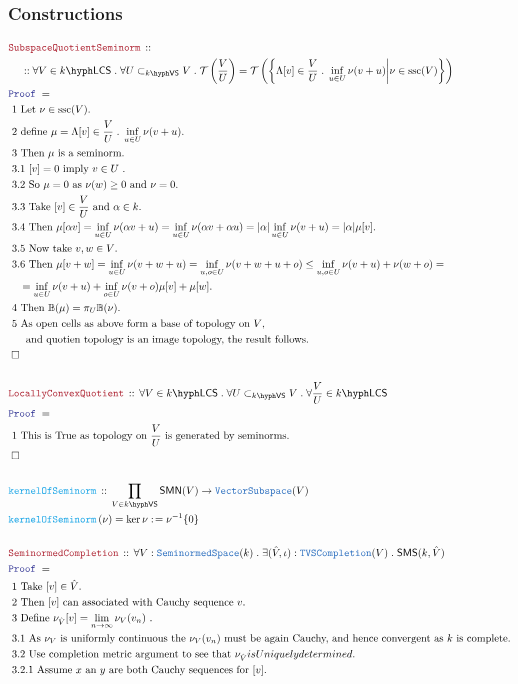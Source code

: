 \documentclass[12pt]{scrartcl}
\newcommand{\TYPE}[1]{\textcolor{NavyBlue}{\mathtt{#1}}}
\newcommand{\FUNC}[1]{\textcolor{Cerulean}{\mathtt{#1}}}
\newcommand{\LOGIC}[1]{\textcolor{Blue}{\mathtt{#1}}}
\newcommand{\THM}[1]{\textcolor{Maroon}{\mathtt{#1}}}
\renewcommand{\.}{\; . \;}
\newcommand{\de}{: \kern 0.1pc =}
\newcommand{\Act}[1]{\left( #1 \right)}
\newcommand{\Theorem}[2]{& \THM{#1} \, :: \, #2 \\ & \Proof = \\ }
\newcommand{\DeclareFunc}[2]{& \FUNC{#1} \, :: \, #2 \\}
\newcommand{\DefineNamedFunc}[4]{&  \FUNC{#1}\Act{#2} = #3 \de #4 \\}
\newcommand{\NewLine}{\\ & \kern 1pc}
\newcommand{\Page}[1]{ \begin{align*} #1 \end{align*}   }
\newcommand{\Explain}[1]{& \text{#1.} \\}
\newcommand{\ExplainFurther}[1]{& \text{#1} \\}
\newcommand{\QED}{\; \square}
\newcommand{\EndProof}{& \QED \\}
\newcommand{\Proof}{\LOGIC{Proof} \; }
\newcommand{\T}{\mathcal{T}}
\newcommand{\Cell}{\mathbb{B}}
\newcommand{\SMS}{\mathsf{SMS}}
\newcommand{\subvec}[1]{\subset_{\VS{#1}}}%
\newcommand{\VS}[1]{#1\hyph\mathsf{VS}} %
\newcommand{\LCS}[1]{{#1}\hyph\mathsf{LCS}}
\newcommand{\SMN}{\mathsf{SMN}}
\DeclareMathOperator{\ssc}{ssc}
\begin{document}
\subsubsection{Constructions}
\Page{
	\Theorem{SubspaceQuotientSeminorm}
	{
		\NewLine ::		
		\forall V \in \LCS{k} \.
		\forall U \subvec{k} V  \.
		\T\left( \frac{V}{U} \right) = 
		\T\left( \left\{   \Lambda [v] \in \frac{V}{U} \.  \inf_{u \in U} \nu(v + u) \bigg| \nu \in \ssc(V)
		\right\} \right)
	}
	\Explain{ 1 Let $\nu \in \ssc(V)$}
	\Explain{ 2 define $\mu = \Lambda [v] \in \frac{V}{U} \.  \inf_{u \in U} \nu(v + u)$}
	\Explain{ 3 Then $\mu$ is a seminorm}
	\Explain{ 3.1 $[v] = 0$ imply $v \in U$ }
	\Explain{ 3.2 So $\mu=0$ as $\nu(w) \ge 0$ and $\nu=0$}
	\Explain{ 3.3 Take $[v] \in \frac{V}{U}$ and $\alpha \in k$}
	\Explain{ 3.4 Then $\mu[\alpha v] = 
		\inf_{u \in U} \nu(\alpha v + u) = \inf_{u \in U} \nu(\alpha v  + \alpha u ) =
		|\alpha|   \inf_{u \in U} \nu( v + u) = |\alpha|\mu[v]
		$}
	\Explain{ 3.5 Now take $v,w \in V$} 
	\ExplainFurther{ 3.6 Then    
			$			
			\mu[ v +w]	=
			\inf_{u \in U} \nu(v + w + u) =
			\inf_{u,o \in U} \nu(v + w + u + o) \le 
			\inf_{u,o \in U}  \nu(v + u) + \nu(w + o) =$}
	\Explain{
			$\quad  = \inf_{u \in U} \nu(v + u) + \inf_{o \in U} \nu(v + o) 
			\mu[v] + \mu[w]
			$}
	\Explain{ 4 Then $\Cell(\mu) = \pi_U \Cell(\nu)$}
	\ExplainFurther{ 5 As open cells as above form a base of topology on $V$,}
	\Explain{ $\quad$ and quotien topology is an image topology, the result follows}
	\EndProof
	\\
	\Theorem{LocallyConvexQuotient}
	{
		\forall V \in \LCS{k} \.
		\forall U \subvec{k} V \.
		\forall \frac{V}{U} \in \LCS{k}	
	}
	\Explain{
		1 This is True as topology on $\frac{V}{U}$	is generated by seminorms}
	\EndProof
	\\
	\DeclareFunc{kernelOfSeminorm}
	{
		\prod_{V \in \VS{k}} 
		\SMN(V) \to \TYPE{VectorSubspace}(V)
	}
	\DefineNamedFunc{kernelOfSeminorm}{\nu}{\ker \nu}{\nu^{-1}\{0\}}
	\\
	\Theorem{SeminormedCompletion}
	{
		\forall V : \TYPE{SeminormedSpace}(k) \.
		\exists (\hat V,\iota) : \TYPE{TVSCompletion}(V) \.
		\SMS(k,\hat V) 
	}
	\Explain{ 1 Take $[v] \in \hat V$}
	\Explain{ 2 Then $[v]$ can associated with Cauchy sequence  $v$}
	\Explain{ 3 Define $\nu_{\hat V}[v] = \lim_{n \to \infty} \nu_V(v_n)$ }
	\Explain{ 3.1 As $\nu_V$ is uniformly continuous the $\nu_V(v_n)$ must be again Cauchy, 
		and hence convergent as $k$ is complete}
	\Explain{ 3.2 Use completion metric argument to see that $\nu_{\hat V} is Uniquely determined$}
	\Explain{ 3.2.1 Assume $x$ an $y$ are both Cauchy sequences for $[v]$}
}
\end{document}
